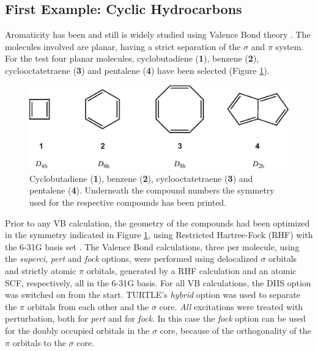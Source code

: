 \subsection{\label{ch2.sec.aromat}First Example: Cyclic Hydrocarbons}

Aromaticity has been and still is widely studied using Valence Bond theory \cite{cooper1,cooper2,remcolowdin,indacene,fowler,jenneskens,cyclohexatriene,bestbenzene,benzyne}. The molecules involved are planar, having a strict separation of the $\sigma$ and $\pi$ system. For the test four planar molecules, cyclobutadiene (\textbf{1}), benzene (\textbf{2}), cyclooctatetraene (\textbf{3}) and pentalene (\textbf{4}) have been selected (Figure \ref{ch2.fig.compounds}).
\begin{figure}[htdp]
\center
\includegraphics[scale=0.85]{orbopt/figures/compounds.eps}
\caption{Cyclobutadiene (\textbf{1}), benzene (\textbf{2}), cyclooctatetraene (\textbf{3}) and pentalene (\textbf{4}). Underneath the compound numbers the symmetry used for the respective compounds has been printed.}
\label{ch2.fig.compounds}
\end{figure}

Prior to any VB calculation, the geometry of the compounds had been optimized in the symmetry indicated in Figure \ref{ch2.fig.compounds}, using Restricted Hartree-Fock (RHF) with the \mbox{6-31G} basis set \cite{631g1,631g2}. The Valence Bond calculations, three per molecule, using the \textit{superci}, \textit{pert} and \textit{fock} options, were performed using delocalized $\sigma$ orbitals and strictly atomic $\pi$ orbitals, generated by a RHF calculation and an atomic SCF, respectively, all in the 6-31G basis. For all VB calculations, the DIIS option was switched on from the start. TURTLE's \textit{hybrid} option was used to separate the $\pi$ orbitals from each other and the $\sigma$ core. \textit{All} excitations were treated with perturbation, both for \textit{pert} and for \textit{fock}. In this case the \textit{fock} option can be used for the doubly occupied orbitals in the $\sigma$ core, because of the orthogonality of the $\pi$ orbitals to the $\sigma$ core. 

